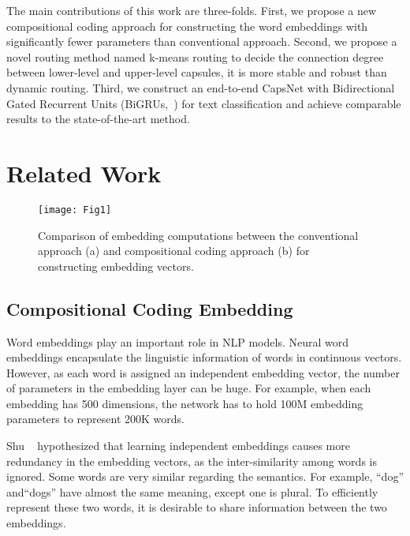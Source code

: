 \documentclass[times,twocolumn,final]{elsarticle}
\begin{document}
The main contributions of this work are three-folds. First, we propose a new compositional coding approach for constructing the word embeddings with significantly fewer parameters than conventional approach. Second, we propose a novel routing method named k-means routing to decide the connection degree between lower-level and upper-level capsules, it is more stable and robust than dynamic routing. Third, we construct an end-to-end CapsNet with Bidirectional Gated Recurrent Units (BiGRUs,~\cite{schuster1997bidirectional, cho2014properties}) for text classification and achieve comparable results to the state-of-the-art method.

\section{Related Work}

\begin{figure}
  \centering
  \texttt{[image: Fig1]}
  \caption{Comparison of embedding computations between the conventional approach (a) and compositional coding approach (b) for constructing embedding vectors.}
  \label{embedding_coding}
\end{figure}

\subsection{Compositional Coding Embedding}

Word embeddings play an important role in NLP models. Neural word embeddings encapsulate the linguistic information of words in continuous vectors. However, as each word is assigned an independent embedding vector, the number of parameters in the embedding layer can be huge. For example, when each embedding has 500 dimensions, the network has to hold 100M embedding parameters to represent 200K words.

Shu \etal~\cite{shu2018compressing} hypothesized that learning independent embeddings causes more redundancy in the embedding vectors, as the inter-similarity among words is ignored. Some words are very similar regarding the semantics. For example, ``dog'' and``dogs'' have almost the same meaning, except one is plural. To efficiently represent these two words, it is desirable to share information between the two embeddings.
\end{document}
